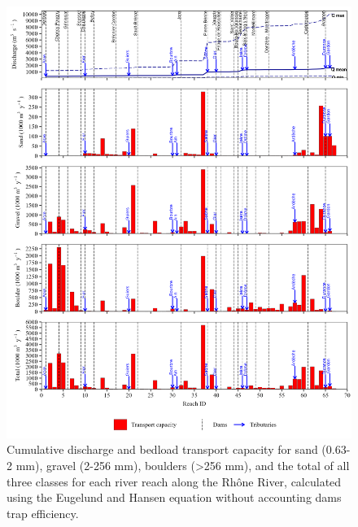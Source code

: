 \documentclass[
]{book}
\begin{document}
\begin{figure}
\includegraphics[width=26.24in]{img/res_cascade/res_E0_eE&H_noDams/plots_tr_cap-silt/tr_cap_res_sum_hy_E0_eE&H_noDams} \caption{Cumulative discharge and bedload transport capacity for sand (0.63-2 mm), gravel (2-256 mm), boulders (>256 mm), and the total of all three classes for each river reach along the Rhône River, calculated using the Eugelund and Hansen equation without accounting dams trap efficiency.}\label{fig:TrcE0eE}
\end{figure}
\end{document}
